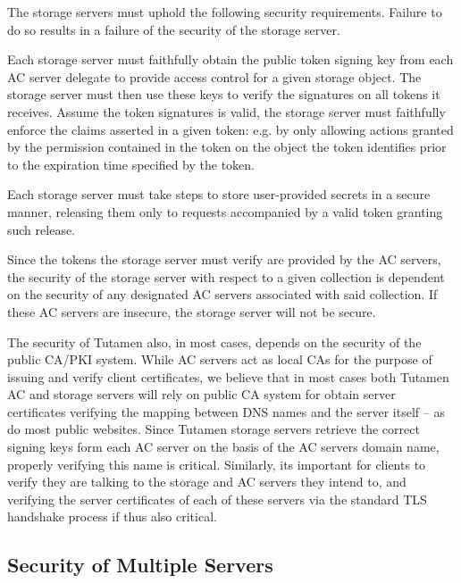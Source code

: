 The storage servers must uphold the following security
requirements. Failure to do so results in a failure of the security of
the storage server.

\begin{packed_desc}
\item[Token Verification:] Each storage server must faithfully obtain
  the public token signing key from each AC server delegate to provide
  access control for a given storage object. The storage server must
  then use these keys to verify the signatures on all tokens it
  receives. Assume the token signatures is valid, the storage server
  must faithfully enforce the claims asserted in a given token:
  e.g. by only allowing actions granted by the permission contained in
  the token on the object the token identifies prior to the expiration
  time specified by the token.
\item[Secure Storage:] Each storage server must take steps to store
  user-provided secrets in a secure manner, releasing them only to
  requests accompanied by a valid token granting such release.
\end{packed_desc}

Since the tokens the storage server must verify are provided by the AC
servers, the security of the storage server with respect to a given
collection is dependent on the security of any designated AC servers
associated with said collection. If these AC servers are insecure, the
storage server will not be secure.

The security of Tutamen also, in most cases, depends on the security
of the public CA/PKI system. While AC servers act as local CAs for the
purpose of issuing and verify client certificates, we believe that in
most cases both Tutamen AC and storage servers will rely on public CA
system for obtain server certificates verifying the mapping between
DNS names and the server itself -- as do most public websites. Since
Tutamen storage servers retrieve the correct signing keys form each AC
server on the basis of the AC servers domain name, properly verifying
this name is critical. Similarly, its important for clients to verify
they are talking to the storage and AC servers they intend to, and
verifying the server certificates of each of these servers via the
standard TLS handshake process if thus also critical.


\subsection{Security of Multiple Servers}

